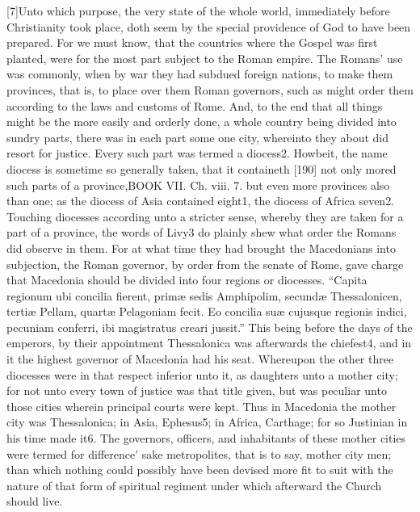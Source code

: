 [7]Unto which purpose, the very state of the whole world, immediately before Christianity took place, doth seem by the special providence of God to have been prepared. For we must know, that the countries where the Gospel was first planted, were for the most part subject to the Roman empire. The Romans’ use was commonly, when by war they had subdued foreign nations, to make them provinces, that is, to place over them Roman governors, such as might order them according to the laws and customs of Rome. And, to the end that all things might be the more easily and orderly done, a whole country being divided into sundry parts, there was in each part some one city, whereinto they about did resort for justice. Every such part was termed a diocess2. Howbeit, the name diocess is sometime so generally taken, that it containeth [190] not only mored such parts of a province,BOOK VII. Ch. viii. 7. but even more provinces also than one; as the diocess of Asia contained eight1, the diocess of Africa seven2. Touching diocesses according unto a stricter sense, whereby they are taken for a part of a province, the words of Livy3 do plainly shew what order the Romans did observe in them. For at what time they had brought the Macedonians into subjection, the Roman governor, by order from the senate of Rome, gave charge that Macedonia should be divided into four regions or diocesses. “Capita regionum ubi concilia fierent, primæ sedis Amphipolim, secundæ Thessalonicen, tertiæ Pellam, quartæ Pelagoniam fecit. Eo concilia suæ cujusque regionis indici, pecuniam conferri, ibi magistratus creari jussit.” This being before the days of the emperors, by their appointment Thessalonica was afterwards the chiefest4, and in it the highest governor of Macedonia had his seat. Whereupon the other three diocesses were in that respect inferior unto it, as daughters unto a mother city; for not unto every town of justice was that title given, but was peculiar unto those cities wherein principal courts were kept. Thus in Macedonia the mother city was Thessalonica; in Asia, Ephesus5; in Africa, Carthage; for so Justinian in his time made it6. The governors, officers, and inhabitants of these mother cities were termed for difference’ sake metropolites, that is to say, mother city men; than which nothing could possibly have been devised more fit to suit with the nature of that form of spiritual regiment under which afterward the Church should live.

